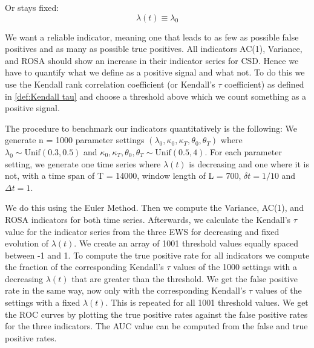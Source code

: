 \documentclass[%
thesis=student,%
coverpage=false,%
titlepage=false,%
headmarks=true, %
english,%
font=libertine, %
math=newpxtx, %
BCOR=5mm,%
coverBCOR=11mm%
]{tumbook}
\begin{document}
Or stays fixed: 
    \[
    \lambda(t)\equiv\lambda_{0}
    \]

We want a reliable indicator, meaning one that leads to as few as possible false positives and as many as possible true positives. All indicators AC(1), Variance, and ROSA should show an increase in their indicator series for CSD. Hence we have to quantify what we define as a positive signal and what not. To do this we use the Kendall rank correlation coefficient (or Kendall's $\tau$ coefficient) as defined in \ref{def:Kendall tau} and choose a threshold above which we count something as a positive signal. 



The procedure to benchmark our indicators quantitatively is the following:
We generate n = 1000 parameter settings $(\lambda_{0},\kappa_{0},\kappa_{T},\theta_{0},\theta_{T})$ where $\lambda_{0} \sim \text{Unif}(0.3,0.5)$ and $\kappa_{0},\kappa_{T},\theta_{0},\theta_{T} \sim \text{Unif}(0.5,4)$. For each parameter setting, we generate one time series where $\lambda(t)$ is decreasing and one where it is not, with a time span of T = 14000, window length of L = 700, $\delta t = 1/10$ and $\Delta t = 1$.


 We do this using the Euler Method. Then we compute the Variance, AC(1), and ROSA indicators for both time series. Afterwards, we calculate the Kendall's $\tau$ value for the indicator series from the three EWS for decreasing and fixed evolution of $\lambda(t)$. We create an array of 1001 threshold values equally spaced between -1 and 1. To compute the true positive rate for all indicators we compute the fraction of the corresponding Kendall's $\tau$ values of the 1000 settings with a decreasing $\lambda(t)$ that are greater than the threshold. We get the false positive rate in the same way, now only with the corresponding Kendall's $\tau$ values of the settings with a fixed $\lambda(t)$. This is repeated for all 1001 threshold values. We get the ROC curves by plotting the true positive rates against the false positive rates for the three indicators.
The AUC value can be computed from the false and true positive rates. 
\end{document}
